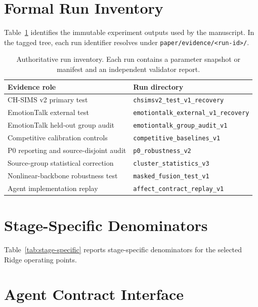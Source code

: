 \documentclass[journal]{IEEEtran}
\begin{document}
\appendices

\section{Formal Run Inventory}
\label{app:runs}

Table~\ref{tab:runs} identifies the immutable experiment outputs used by the manuscript. In the tagged tree, each run identifier resolves under \texttt{paper/evidence/<run-id>/}.

\begin{table}[h]
\centering
\caption{Authoritative run inventory. Each run contains a parameter snapshot or manifest and an independent validator report.}
\label{tab:runs}
\begin{tabular}{p{}p{}}
\toprule
Evidence role & Run directory \\
\midrule
CH-SIMS v2 primary test & \nolinkurl{chsimsv2_test_v1_recovery} \\
EmotionTalk external test & \nolinkurl{emotiontalk_external_v1_recovery} \\
EmotionTalk held-out group audit & \nolinkurl{emotiontalk_group_audit_v1} \\
Competitive calibration controls & \nolinkurl{competitive_baselines_v1} \\
P0 reporting and source-disjoint audit & \nolinkurl{p0_robustness_v2} \\
Source-group statistical correction & \nolinkurl{cluster_statistics_v3} \\
Nonlinear-backbone robustness test & \nolinkurl{masked_fusion_test_v1} \\
Agent implementation replay & \nolinkurl{affect_contract_replay_v1} \\
\bottomrule
\end{tabular}
\end{table}

\pagebreak[4]
\section{Stage-Specific Denominators}
\label{app:stage}

Table~\ref{tab:stage-specific} reports stage-specific denominators for the selected Ridge operating points.



\section{Agent Contract Interface}
\end{document}
